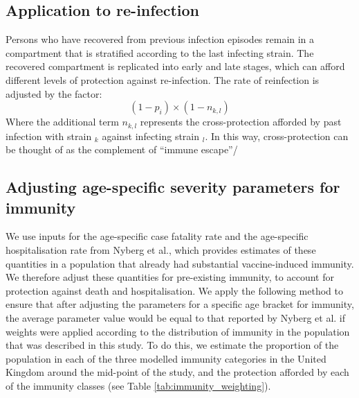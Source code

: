 \subsection{Application to re-infection}
Persons who have recovered from previous infection episodes 
remain in a compartment that is stratified
according to the last infecting strain.
The recovered compartment is replicated into early and late stages,
which can afford different levels of protection against re-infection.
The rate of reinfection is adjusted by the factor:
\[(1 - p_{i})\times (1 - n_{k,l})\]
Where the additional term \(n_{k,l}\) represents the cross-protection
afforded by past infection with strain \(_{k}\)
against infecting strain \(_{l}\).
In this way, cross-protection can be thought of as the complement
of ``immune escape''/

\subsection{Adjusting age-specific severity parameters for immunity}
We use inputs for the age-specific case fatality rate and the age-specific hospitalisation rate from Nyberg et al., 
which provides estimates of these quantities in a population that already had substantial vaccine-induced immunity.
We therefore adjust these quantities for pre-existing immunity, to account for protection against death and hospitalisation.
We apply the following method to ensure that after adjusting the parameters for a specific age bracket for immunity,
the average parameter value would be equal to that reported by Nyberg et al. if weights were applied according to the
distribution of immunity in the population that was described in this study.
To do this, we estimate the proportion of the population in each of the three modelled immunity categories
in the United Kingdom around the mid-point of the study,
and the protection afforded by each of the immunity classes (see Table \ref{tab:immunity_weighting}).


